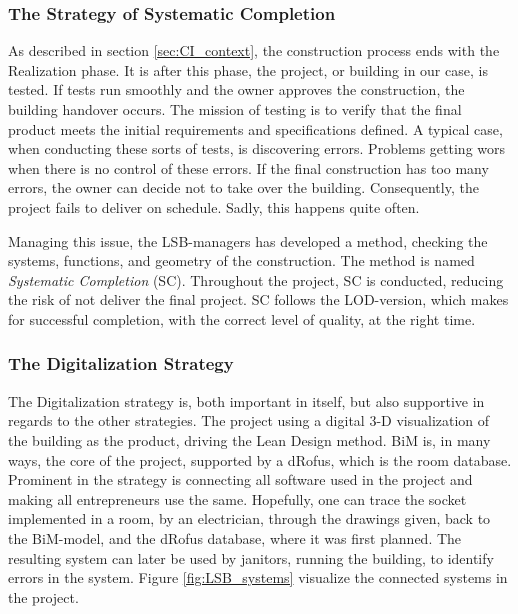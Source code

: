 \subsubsection*{The Strategy of Systematic Completion}
As described in section \ref{sec:CI_context}, the construction process ends with the Realization phase. It is after this phase, the project, or building in our case, is tested. If tests run smoothly and the owner approves the construction, the building handover occurs. The mission of testing is to verify that the final product meets the initial requirements and specifications defined. A typical case, when conducting these sorts of tests, is discovering errors. Problems getting wors when there is no control of these errors. If the final construction has too many errors, the owner can decide not to take over the building. Consequently, the project fails to deliver on schedule. Sadly, this happens quite often.

Managing this issue, the LSB-managers has developed a method, checking the systems, functions, and geometry of the construction. The method is named \textit{Systematic Completion} (SC). Throughout the project, SC is conducted, reducing the risk of not deliver the final project. SC follows the LOD-version, which makes for successful completion, with the correct level of quality, at the right time.

\subsubsection*{The Digitalization Strategy}
The Digitalization strategy is, both important in itself, but also supportive in regards to the other strategies. The project using a digital 3-D visualization of the building as the product, driving the Lean Design method. BiM is, in many ways, the core of the project, supported by a dRofus, which is the room database. Prominent in the strategy is connecting all software used in the project and making all entrepreneurs use the same. Hopefully, one can trace the socket implemented in a room, by an electrician, through the drawings given, back to the BiM-model, and the dRofus database, where it was first planned. The resulting system can later be used by janitors, running the building, to identify errors in the system.  Figure \ref{fig:LSB_systems} visualize the connected systems in the project.

